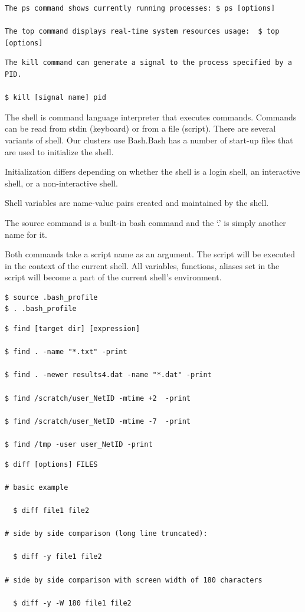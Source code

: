\begin{verbatim}
The ps command shows currently running processes: $ ps [options]

The top command displays real-time system resources usage:  $ top [options]
\end{verbatim}


\begin{verbatim}
The kill command can generate a signal to the process specified by a PID.

$ kill [signal name] pid

\end{verbatim}

The shell is command language interpreter that executes commands. Commands can be read from stdin (keyboard) or from a file (script). There are several variants of shell.  Our clusters use Bash.Bash has a number of start-up files that are used to initialize the shell.

Initialization differs depending on whether the shell is a login shell, an interactive shell, or a non-interactive shell.

Shell variables are name-value pairs created and maintained by the shell.

The source command is a built-in bash command and the ‘.’ is simply another name for it.

Both commands take a script name as an argument.  The script will be executed in the context of the current shell.  All variables, functions, aliases set in the script will become a part of the current shell’s environment.
\begin{verbatim}
$ source .bash_profile
$ . .bash_profile
\end{verbatim}


\begin{Verbatim}
$ find [target dir] [expression]

$ find . -name "*.txt" -print
 
$ find . -newer results4.dat -name "*.dat" -print
 
$ find /scratch/user_NetID -mtime +2  -print
 
$ find /scratch/user_NetID -mtime -7  -print
 
$ find /tmp -user user_NetID -print
\end{Verbatim}

\begin{verbatim}
$ diff [options] FILES
 
# basic example
 
  $ diff file1 file2
 
# side by side comparison (long line truncated):
 
  $ diff -y file1 file2
 
# side by side comparison with screen width of 180 characters
 
  $ diff -y -W 180 file1 file2

\end{verbatim}


